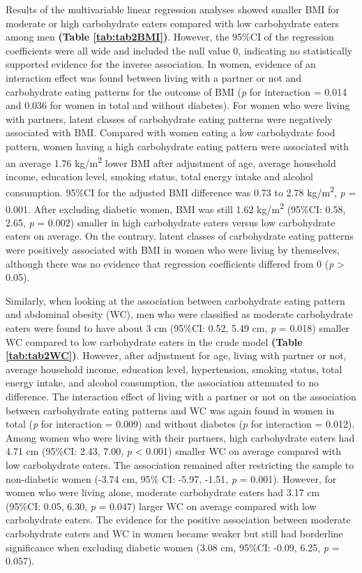 

Results of the multivariable linear regression analyses showed smaller BMI for moderate or high carbohydrate eaters compared with low carbohydrate eaters among men \textbf{(Table \ref{tab:tab2BMI})}. However, the 95\%CI of the regression coefficients were all wide and included the null value 0, indicating no statistically supported evidence for the inverse association. In women, evidence of an interaction effect was found between living with a partner or not and carbohydrate eating patterns for the outcome of BMI (\textit{p} for interaction = 0.014 and 0.036 for women in total and without diabetes). For women who were living with partners, latent classes of carbohydrate eating patterns were negatively associated with BMI. Compared with women eating a low carbohydrate food pattern, women having a high carbohydrate eating pattern were associated with an average 1.76 kg/m\textsuperscript{2} lower BMI after adjustment of age, average household income, education level, smoking status, total energy intake and alcohol consumption. 95\%CI for the adjusted BMI difference was 0.73 to 2.78 kg/m\textsuperscript{2}, \textit{p} = 0.001. After excluding diabetic women, BMI was still 1.62 kg/m\textsuperscript{2} (95\%CI: 0.58, 2.65, \textit{p} = 0.002) smaller in high carbohydrate eaters versus low carbohydrate eaters on average. On the contrary, latent classes of carbohydrate eating patterns were positively associated with BMI in women who were living by themselves, although there was no evidence that regression coefficients differed from 0 (\textit{p} > 0.05).


Similarly, when looking at the association between carbohydrate eating pattern and abdominal obesity (WC), men who were classified as moderate carbohydrate eaters were found to have about 3 cm (95\%CI: 0.52, 5.49 cm, \textit{p} = 0.018) smaller WC compared to low carbohydrate eaters in the crude model \textbf{(Table \ref{tab:tab2WC})}. However, after adjustment for age, living with partner or not, average household income, education level, hypertension, smoking status, total energy intake, and alcohol consumption, the association attenuated to no difference. The interaction effect of living with a partner or not on the association between carbohydrate eating patterns and WC was again found in women in total (\textit{p} for interaction = 0.009) and without diabetes (\textit{p} for interaction = 0.012). Among women who were living with their partners, high carbohydrate eaters had 4.71 cm (95\%CI: 2.43, 7.00, \textit{p} < 0.001) smaller WC on average compared with low carbohydrate eaters. The association remained after restricting the sample to non-diabetic women (-3.74 cm, 95\% CI: -5.97, -1.51,  \textit{p} = 0.001). However, for women who were living alone, moderate carbohydrate eaters had 3.17 cm (95\%CI: 0.05, 6.30, \textit{p} = 0.047) larger WC on average compared with low carbohydrate eaters. The evidence for the positive association between moderate carbohydrate eaters and WC in women became weaker but still had borderline significance when excluding diabetic women (3.08 cm, 95\%CI: -0.09, 6.25, \textit{p} = 0.057).
   



